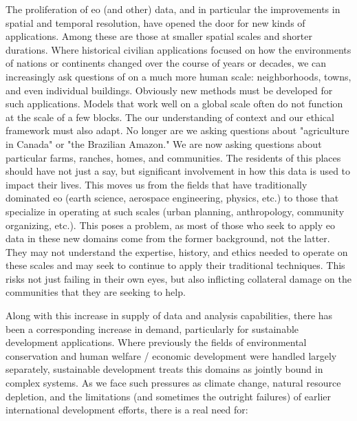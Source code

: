 The proliferation of \ac{eo} (and other) data, and in particular the improvements in spatial and temporal resolution, have opened the door for new kinds of applications. Among these are those at smaller spatial scales and shorter durations. Where historical civilian applications focused on how the environments of nations or continents changed over the course of years or decades, we can increasingly ask questions of on a much more human scale: neighborhoods, towns, and even individual buildings. Obviously new methods must be developed for such applications. Models that work well on a global scale often do not function at the scale of a few blocks. The our understanding of context and our ethical framework must also adapt. No longer are we asking questions about "agriculture in Canada" or "the Brazilian Amazon." We are now asking questions about particular farms, ranches, homes, and communities. The residents of this places should have not just a say, but significant involvement in how this data is used to impact their lives. This moves us from the fields that have traditionally dominated \ac{eo} (earth science, aerospace engineering, physics, etc.) to those that specialize in operating at such scales (urban planning, anthropology, community organizing, etc.). This poses a problem, as most of those who seek to apply \ac{eo} data in these new domains come from the former background, not the latter. They may not understand the expertise, history, and ethics needed to operate on these scales and may seek to continue to apply their traditional techniques. This risks not just failing in their own eyes, but also inflicting collateral damage on the communities that they are seeking to help.

Along with this increase in supply of data and analysis capabilities, there has been a corresponding increase in demand, particularly for sustainable development applications. Where previously the fields of environmental conservation and human welfare / economic development were handled largely separately, sustainable development treats this domains as jointly bound in complex systems. As we face such pressures as climate change, natural resource depletion, and the limitations (and sometimes the outright failures) of earlier international development efforts, there is a real need for:

